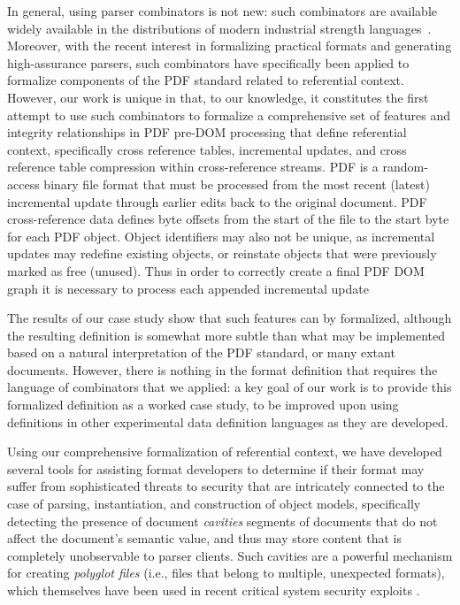 In general, using parser combinators is not new: such combinators are
available widely available in the distributions of modern industrial
strength languages~.
%
Moreover, with the recent interest in formalizing practical formats
and generating high-assurance parsers, such combinators have
specifically been applied to formalize components of the
PDF standard related to referential context.
%
However, our work is unique in that, to our knowledge, it constitutes
the first attempt to use such combinators to formalize a comprehensive
set of features and integrity relationships in PDF pre-DOM processing 
that define referential context, specifically cross reference tables, 
incremental updates, and cross reference table compression within 
cross-reference streams. PDF is a random-access binary file format that must be 
processed from the most recent (latest) incremental update through earlier edits 
back to the original document.  PDF cross-reference data defines byte offsets from the start of the file to
the start byte for each PDF object. Object identifiers may also not 
be unique, as incremental updates may redefine existing objects, or reinstate 
objects that were previously marked as free (unused). Thus in order to correctly
create a final PDF DOM graph it is necessary to process each appended incremental update

The results of our case study show that such features can by formalized, 
although the resulting definition is somewhat more subtle than what may be 
implemented based on a natural interpretation of the PDF standard, or many extant documents. 
%
However, there is nothing in the format definition
that requires the language of combinators that we applied: a key goal
of our work is to provide this formalized definition as a worked case
study, to be improved upon using definitions in other experimental
data definition languages as they are developed.

Using our comprehensive formalization of referential context, we have
developed several tools for assisting format developers to determine
if their format may suffer from sophisticated threats to security that
are intricately connected to the case of parsing, instantiation, and construction of object models,
specifically detecting the presence of document \emph{cavities}
segments of documents that do not affect the document's semantic
value, and thus may store content that is completely unobservable to
parser clients.
%
Such cavities are a powerful mechanism for creating \emph{polyglot
  files} (i.e., files that belong to multiple, unexpected formats),
which themselves have been used in recent critical system security
exploits .

